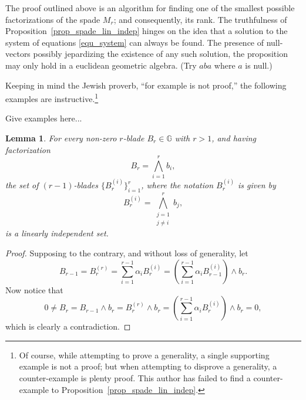 \documentclass{birkjour}
\newtheorem{lem}[thm]{Lemma}
\theoremstyle{definition}
\theoremstyle{remark}
\numberwithin{equation}{section}
\newcommand{\G}{\mathbb{G}}
\begin{document}
The proof outlined above is an algorithm for finding one of the smallest possible factorizations of the spade $M_r$; and consequently, its rank.  The truthfulness of Proposition~\ref{prop_spade_lin_indep} hinges on the idea
that a solution to the system of equations \eqref{equ_system} can always be found.  The presence of null-vectors possibly jepardizing the
existence of any such solution, the proposition may only hold in a euclidean geometric algebra.  (Try $aba$ where $a$ is null.)

Keeping in mind the Jewish proverb, ``for example is not proof,'' the following examples are instructive.\footnote{Of course, while attempting to prove a generality,
a single supporting example is not a proof; but when attempting to disprove a generality, a counter-example is plenty proof.  This author has failed to find
a counter-example to Proposition~\ref{prop_spade_lin_indep}.}

Give examples here...

\begin{lem}\label{lem_lin_indep_subblades}
For every non-zero $r$-blade $B_r\in\G$ with $r>1$, and having factorization
\begin{equation*}
B_r = \bigwedge_{i=1}^r b_i,
\end{equation*}
the set of $(r-1)$-blades $\{B_r^{(i)}\}_{i=1}^r$, where the notation $B_r^{(i)}$ is given by
\begin{equation*}
B_r^{(i)}=\bigwedge_{\substack{j=1\\j\neq i}}^r b_j,
\end{equation*}
is a linearly independent set.
\end{lem}
\begin{proof}
Supposing to the contrary, and without loss of generality, let
\begin{equation*}
B_{r-1} = B_r^{(r)} = \sum_{i=1}^{r-1}\alpha_i B_r^{(i)} = \left(\sum_{i=1}^{r-1}\alpha_i B_{r-1}^{(i)}\right)\wedge b_r.
\end{equation*}
Now notice that
\begin{equation*}
0\neq B_r = B_{r-1}\wedge b_r = B_r^{(r)}\wedge b_r = \left(\sum_{i=1}^{r-1}\alpha_i B_r^{(i)}\right)\wedge b_r = 0,
\end{equation*}
which is clearly a contradiction.
\end{proof}
\end{document}
